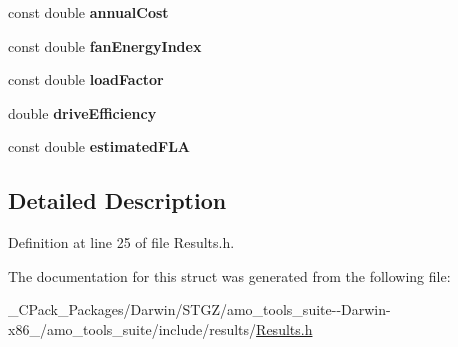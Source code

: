 \begin{DoxyCompactItemize}
const double {\bfseries annual\+Cost}
\item 
\mbox{\label{struct_fan_result_1_1_output_a4ecd26ce3f950d847f562bbc709af587}} 
const double {\bfseries fan\+Energy\+Index}
\item 
\mbox{\label{struct_fan_result_1_1_output_af69651dbc14072bec6c9f009193c62fa}} 
const double {\bfseries load\+Factor}
\item 
\mbox{\label{struct_fan_result_1_1_output_a0dfe02a7f8b7fdb485246971c22f44e2}} 
double {\bfseries drive\+Efficiency}
\item 
\mbox{\label{struct_fan_result_1_1_output_a87dc83a57a717ae2c7071cbe60459960}} 
const double {\bfseries estimated\+F\+LA}
\end{DoxyCompactItemize}


\subsection{Detailed Description}


Definition at line 25 of file Results.\+h.



The documentation for this struct was generated from the following file\+:\begin{DoxyCompactItemize}
\item 
\+\_\+\+C\+Pack\+\_\+\+Packages/\+Darwin/\+S\+T\+G\+Z/amo\+\_\+tools\+\_\+suite-\/-\/\+Darwin-\/x86\+\_/amo\+\_\+tools\+\_\+suite/include/results/\hyperlink{___c_pack___packages_2_darwin_2_s_t_g_z_2amo__tools__suite--_darwin-x86__64_2amo__tools__suite_2include_2results_2_results_8h}{Results.\+h}\end{DoxyCompactItemize}
